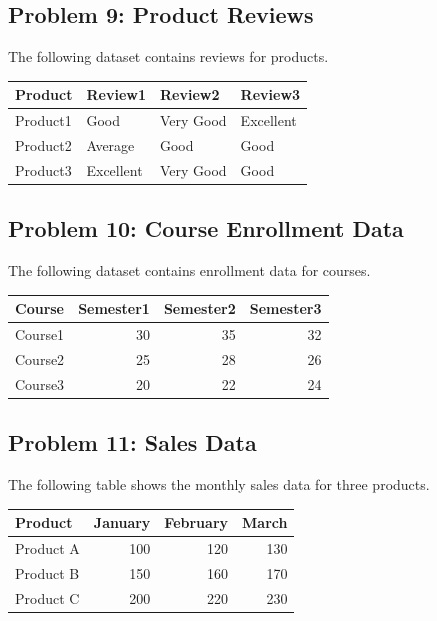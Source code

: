 \documentclass[
  letterpaper,
  DIV=11,
  numbers=noendperiod]{scrreprt}
\begin{document}
\subsection*{Problem 9: Product
Reviews}\label{problem-9-product-reviews}

The following dataset contains reviews for products.

\begin{table}
\centering
\begin{tabular}{l|l|l|l}
\hline
Product & Review1 & Review2 & Review3\\
\hline
Product1 & Good & Very Good & Excellent\\
\hline
Product2 & Average & Good & Good\\
\hline
Product3 & Excellent & Very Good & Good\\
\hline
\end{tabular}
\end{table}

\subsection*{Problem 10: Course Enrollment
Data}\label{problem-10-course-enrollment-data}

The following dataset contains enrollment data for courses.

\begin{table}
\centering
\begin{tabular}{l|r|r|r}
\hline
Course & Semester1 & Semester2 & Semester3\\
\hline
Course1 & 30 & 35 & 32\\
\hline
Course2 & 25 & 28 & 26\\
\hline
Course3 & 20 & 22 & 24\\
\hline
\end{tabular}
\end{table}

\subsection*{Problem 11: Sales Data}\label{problem-11-sales-data}

The following table shows the monthly sales data for three products.

\begin{table}
\centering
\begin{tabular}{l|r|r|r}
\hline
Product & January & February & March\\
\hline
Product A & 100 & 120 & 130\\
\hline
Product B & 150 & 160 & 170\\
\hline
Product C & 200 & 220 & 230\\
\hline
\end{tabular}
\end{table}
\end{document}
